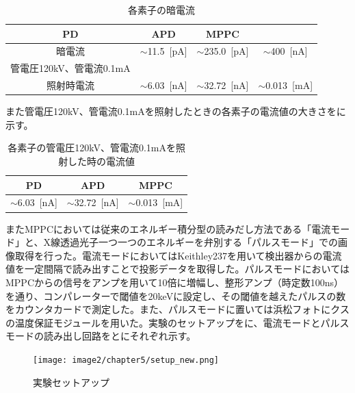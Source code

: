 \begin{table}[H]
  \centering
  \caption{各素子の暗電流}
    \begin{tabular}{cccc}
    \toprule
    PD    & APD   & MPPC \\
    \midrule
    暗電流&$\sim$11.5\ [pA] & $\sim$235.0\ [pA]  & $\sim$400\ [nA]  \\
     管電圧120kV、管電流0.1mA\\照射時電流&$\sim$6.03\ [nA] & $\sim$32.72\ [nA]  & $\sim$0.013\ [mA]  \\
    
    \bottomrule
    \end{tabular}%
  \label{tab:dark_current}%
\end{table}%

また管電圧120kV、管電流0.1mAを照射したときの各素子の電流値の大きさをに示す。

\begin{table}[H]
  \centering
  \caption{各素子の管電圧120kV、管電流0.1mAを照射した時の電流値}
    \begin{tabular}{ccc}
    \toprule
    PD    & APD   & MPPC \\
    \midrule
    $\sim$6.03\ [nA] & $\sim$32.72\ [nA]  & $\sim$0.013\ [mA]  \\
    \bottomrule
    \end{tabular}%
  \label{tab:soshi_current}%
\end{table}%

\fi


またMPPCにおいては従来のエネルギー積分型の読みだし方法である「電流モード」と、X線透過光子一つ一つのエネルギーを弁別する「パルスモード」での画像取得を行った。電流モードにおいてはKeithley237を用いて検出器からの電流値を一定間隔で読み出すことで投影データを取得した。パルスモードにおいてはMPPCからの信号をアンプを用いて10倍に増幅し、整形アンプ（時定数100ns）を通り、コンパレーターで閾値を20keVに設定し、その閾値を越えたパルスの数をカウンタカードで測定した。また、パルスモードに置いては浜松フォトにクスの温度保証モジュールを用いた。実験のセットアップをに、電流モードとパルスモードの読み出し回路をとにそれぞれ示す。

\begin{figure}[H]
 \begin{center}
 \texttt{[image: image2/chapter5/setup\_new.png]} 
 \end{center}
 \caption{実験セットアップ}
 \label{fig:CTsetup}
\end{figure}



